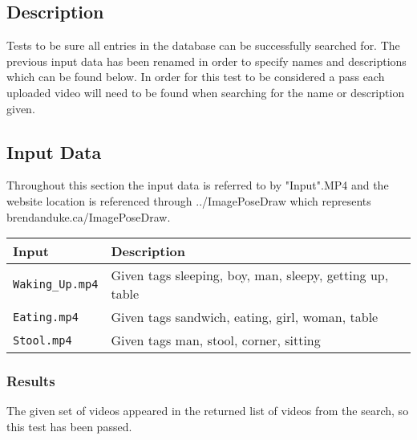 \documentclass{scrreprt}
\begin{document}
\subsection{Description}

Tests to be sure all entries in the database can be successfully searched for. The previous input data has been renamed in order to specify names and descriptions which can be found below. In order for this test to be considered a pass each uploaded video will need to be found when searching for the name or description given.

\subsection{Input Data}

Throughout this section the input data is referred to by "Input".MP4 and the website location is referenced through ../ImagePoseDraw which represents brendanduke.ca/ImagePoseDraw.

\begin{table}[H]
        \centering
        \begin{tabular}{p{3cm}p{6cm}}
                \hline\hline
                Input & Description\\
                \hline\hline
                \verb|Waking_Up.mp4| &  Given tags sleeping, boy, man, sleepy, getting up, table\\
                \hline
                \verb|Eating.mp4| &  Given tags sandwich, eating, girl, woman, table\\
                \hline
                \verb|Stool.mp4| &  Given tags man, stool, corner, sitting\\
                \hline
        \end{tabular}
\end{table}

\subsubsection{Results}

The given set of videos appeared in the returned list of videos from the search, so this test has been passed.
\end{document}

